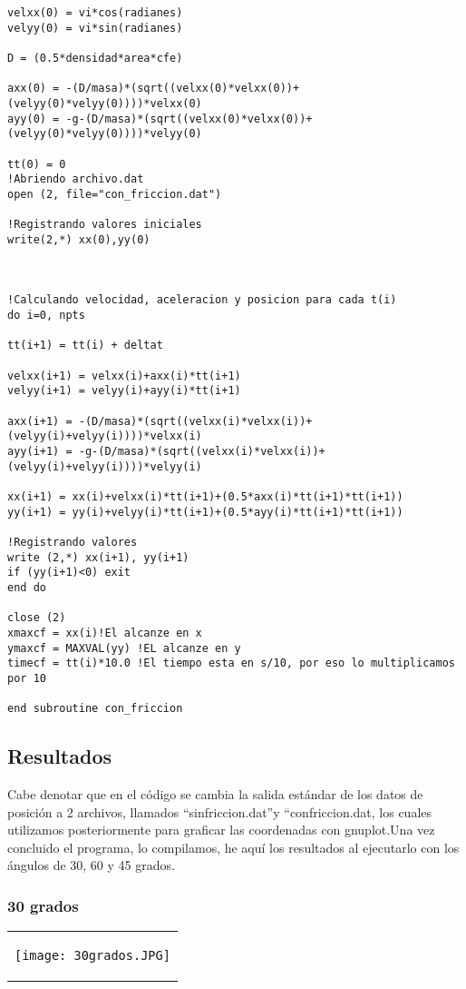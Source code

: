 \documentclass[10pt]{article}
\begin{document}
\begin{verbatim}
velxx(0) = vi*cos(radianes)
velyy(0) = vi*sin(radianes)

D = (0.5*densidad*area*cfe)

axx(0) = -(D/masa)*(sqrt((velxx(0)*velxx(0))+(velyy(0)*velyy(0))))*velxx(0)
ayy(0) = -g-(D/masa)*(sqrt((velxx(0)*velxx(0))+(velyy(0)*velyy(0))))*velyy(0)

tt(0) = 0
!Abriendo archivo.dat 
open (2, file="con_friccion.dat")

!Registrando valores iniciales
write(2,*) xx(0),yy(0)



!Calculando velocidad, aceleracion y posicion para cada t(i)
do i=0, npts

tt(i+1) = tt(i) + deltat

velxx(i+1) = velxx(i)+axx(i)*tt(i+1) 
velyy(i+1) = velyy(i)+ayy(i)*tt(i+1)

axx(i+1) = -(D/masa)*(sqrt((velxx(i)*velxx(i))+(velyy(i)+velyy(i))))*velxx(i)
ayy(i+1) = -g-(D/masa)*(sqrt((velxx(i)*velxx(i))+(velyy(i)+velyy(i))))*velyy(i)

xx(i+1) = xx(i)+velxx(i)*tt(i+1)+(0.5*axx(i)*tt(i+1)*tt(i+1))
yy(i+1) = yy(i)+velyy(i)*tt(i+1)+(0.5*ayy(i)*tt(i+1)*tt(i+1))

!Registrando valores 
write (2,*) xx(i+1), yy(i+1)
if (yy(i+1)<0) exit
end do

close (2)
xmaxcf = xx(i)!El alcanze en x 
ymaxcf = MAXVAL(yy) !EL alcanze en y
timecf = tt(i)*10.0 !El tiempo esta en s/10, por eso lo multiplicamos por 10

end subroutine con_friccion

\end{verbatim} 

\newpage
\subsection{Resultados}
Cabe denotar que en el código se cambia la salida estándar de los datos de posición a 2 archivos, llamados ``sinfriccion.dat''y ``confriccion.dat, los cuales utilizamos posteriormente para graficar las coordenadas con gnuplot.Una vez concluido el programa, lo compilamos, he aquí los resultados al ejecutarlo con los ángulos de 30, 60 y 45 grados.

\subsubsection{30 grados}
\begin{tabular}{c}
\begin{center}
   \texttt{[image: 30grados.JPG]}
\end{center}
\end{tabular}
\end{document}
